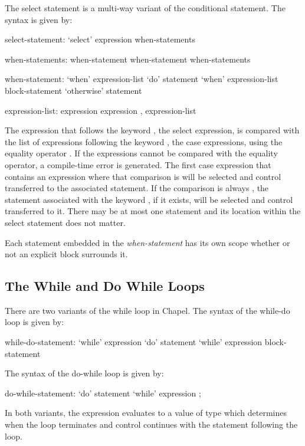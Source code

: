 The select statement is a multi-way variant of the conditional
statement.  The syntax is given by:
\begin{syntax}
select-statement:
  `select' expression { when-statements }

when-statements:
  when-statement
  when-statement when-statements

when-statement:
  `when' expression-list `do' statement
  `when' expression-list block-statement
  `otherwise' statement

expression-list:
  expression
  expression , expression-list
\end{syntax}
The expression that follows the keyword , the select
expression, is compared with the list of expressions following the
keyword , the case expressions, using the equality
operator \chpl{==}.  If the expressions cannot be compared with the
equality operator, a compile-time error is generated.  The first case
expression that contains an expression where that comparison
is  will be selected and control transferred to the
associated statement.  If the comparison is always , the
statement associated with the keyword , if it exists,
will be selected and control transferred to it.  There may be at most
one  statement and its location within the select
statement does not matter.

Each statement embedded in the {\em when-statement} has its own scope
whether or not an explicit block surrounds it.

\subsection{The While and Do While Loops}
\label{The_While_and_Do_While_Loops}


There are two variants of the while loop in Chapel.  The syntax of the
while-do loop is given by:
\begin{syntax}
while-do-statement:
  `while' expression `do' statement
  `while' expression block-statement
\end{syntax}
The syntax of the do-while loop is given by:
\begin{syntax}
do-while-statement:
  `do' statement `while' expression ;
\end{syntax}
In both variants, the expression evaluates to a value of type 
which determines when the loop terminates and control continues with
the statement following the loop.

